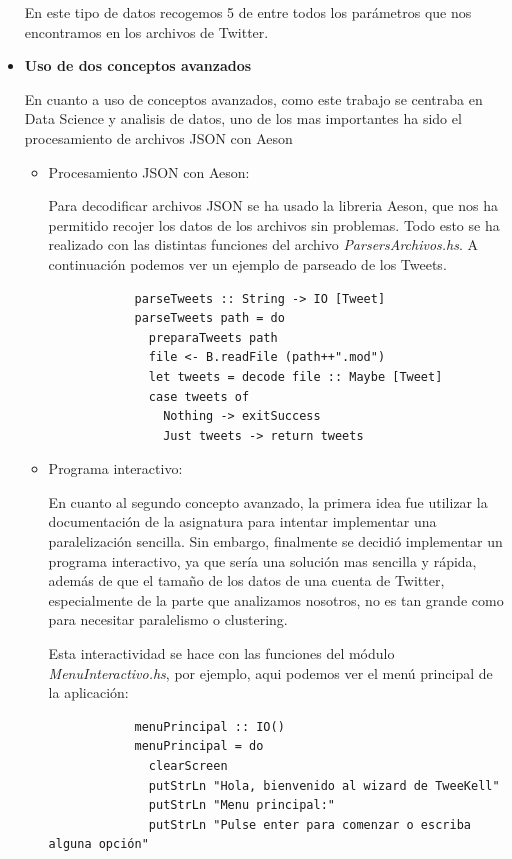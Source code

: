 \documentclass[11pt]{article}
\begin{document}
\begin{itemize}
    En este tipo de datos recogemos 5 de entre todos los parámetros que nos encontramos en los archivos de Twitter.
    
    
    \item \textbf{Uso de dos conceptos avanzados}
    
    En cuanto a uso de conceptos avanzados, como este trabajo se centraba en Data Science y analisis de datos, uno de los mas importantes ha sido el procesamiento de archivos JSON con Aeson
    \begin{itemize}
        \item Procesamiento JSON con Aeson:
        
        Para decodificar archivos JSON se ha usado la libreria Aeson\cite{Aeson}, que nos ha permitido recojer los datos de los archivos sin problemas.
        Todo esto se ha realizado con las distintas funciones del archivo \textit{ParsersArchivos.hs}. A continuación podemos ver un ejemplo de parseado de los Tweets.
        
        \begin{verbatim}
            parseTweets :: String -> IO [Tweet]
            parseTweets path = do
              preparaTweets path
              file <- B.readFile (path++".mod")
              let tweets = decode file :: Maybe [Tweet]
              case tweets of
                Nothing -> exitSuccess
                Just tweets -> return tweets
        \end{verbatim}
        \medskip
        \item Programa interactivo:
        
        En cuanto al segundo concepto avanzado, la primera idea fue utilizar la documentación de la asignatura para intentar implementar una paralelización sencilla. Sin embargo, finalmente se decidió implementar un programa interactivo, ya que sería una solución mas sencilla y rápida, además de que el tamaño de los datos de una cuenta de Twitter, especialmente de la parte que analizamos nosotros, no es tan grande como para necesitar paralelismo o clustering.
        
        Esta interactividad se hace con las funciones del módulo \textit{MenuInteractivo.hs}, por ejemplo, aqui podemos ver el menú principal de la aplicación:
        
        \begin{verbatim}
            menuPrincipal :: IO()
            menuPrincipal = do
              clearScreen
              putStrLn "Hola, bienvenido al wizard de TweeKell"
              putStrLn "Menu principal:"
              putStrLn "Pulse enter para comenzar o escriba alguna opción"
            

\end{verbatim}
\end{itemize}
\end{itemize}
\end{document}
